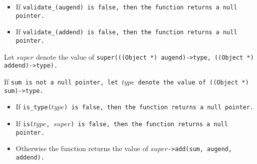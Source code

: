 \begin{itemize}

\item If \tt{validate_(augend)} is \tt{false},
then the function returns a null pointer.

\item If \tt{validate_(addend)} is \tt{false},
then the function returns a null pointer.

\end{itemize}

Let $super$ denote the value of
\tt{super(((Object *) augend)->type, ((Object *) addend)->type)}.

If \tt{sum} is not a null pointer, let $type$
denote the value of \tt{((Object *) sum)->type}.

\begin{itemize}

\item If \tt{is_type(}$type$\tt{)} is \tt{false},
then the function returns a null pointer.

\item If \tt{is(}$type$\tt{,} $super$\tt{)} is \tt{false},
then the function returns a null pointer.

\item Otherwise the function returns the value
of $super$\tt{->add(sum, augend, addend)}.

\end{itemize}
